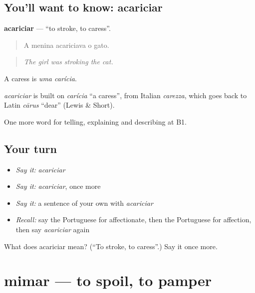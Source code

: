 \subsection*{You'll want to know: acariciar}
\textbf{acariciar} — \textquotedblleft{}to stroke, to caress\textquotedblright{}.

\begin{quote}
A menina acariciava o gato.
\end{quote}

\begin{quote}
\emph{The girl was stroking the cat.}
\end{quote}

A caress is \emph{uma carícia}.

\begin{cousinweb}
\emph{acariciar} is built on \emph{carícia} \textquotedblleft{}a caress\textquotedblright{}, from Italian \emph{carezza}, which goes back to Latin \emph{cārus} \textquotedblleft{}dear\textquotedblright{} (Lewis \& Short).
\end{cousinweb}

\begin{grammarlens}[title={What you've built}]
One more word for telling, explaining and describing at B1.
\end{grammarlens}

\subsection*{Your turn}
\begin{itemize}
\raggedright
  \item \emph{Say it:} \emph{acariciar}
  \item \emph{Say it:} \emph{acariciar}, once more
  \item \emph{Say it:} a sentence of your own with \emph{acariciar}
  \item \emph{Recall:} say the Portuguese for affectionate, then the Portuguese for affection, then say \emph{acariciar} again
\end{itemize}

\begin{tcolorbox}[breakable,colback=teal!4,colframe=teal!35!black,title={Before you move on}]
What does acariciar mean? (\textquotedblleft{}To stroke, to caress\textquotedblright{}.) Say it once more.
\end{tcolorbox}
\section[mimar]{mimar — to spoil, to pamper}

